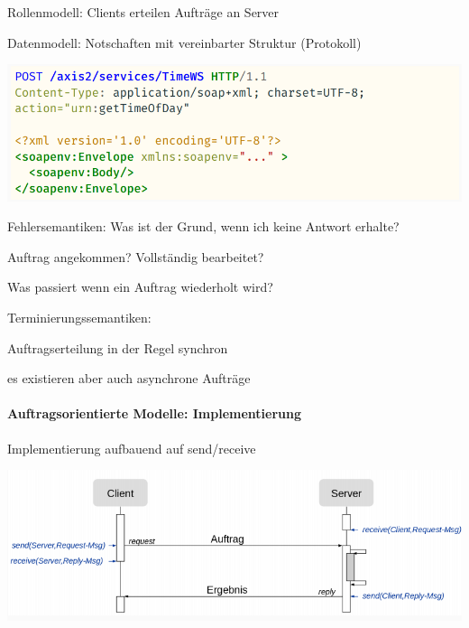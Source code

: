 \documentclass[10pt]{article}
\begin{document}
\begin{itemize*}
  \item Rollenmodell: Clients erteilen Aufträge an Server
  \item Datenmodell: Notschaften mit vereinbarter Struktur (Protokoll)
\end{itemize*}
\begin{center}
  \includegraphics[width=0.4\linewidth]{Assets/Programmierparadigmen-code-snippet-68}
\end{center}
\begin{itemize*}
  \item Fehlersemantiken: Was ist der Grund, wenn ich keine Antwort erhalte?
  \begin{itemize*}
    \item Auftrag angekommen? Vollständig bearbeitet?
    \item Was passiert wenn ein Auftrag wiederholt wird?
  \end{itemize*}
  \item Terminierungssemantiken:
  \begin{itemize*}
    \item Auftragserteilung in der Regel synchron
    \item es existieren aber auch asynchrone Aufträge
  \end{itemize*}
\end{itemize*}

\paragraph{Auftragsorientierte Modelle: Implementierung}

\begin{itemize*}
  \item Implementierung aufbauend auf send/receive
\end{itemize*}
\begin{center}
  \includegraphics[width=0.4\linewidth]{Assets/Programmierparadigmen-kommunikation}
\end{center} \ \linebreak
\end{document}

